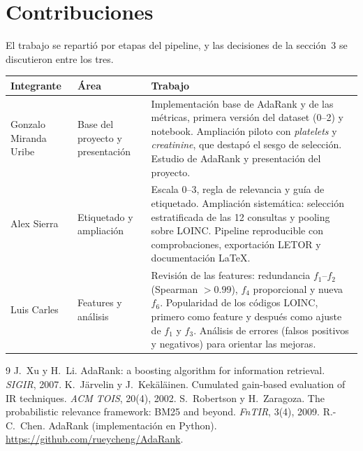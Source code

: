 \documentclass[11pt,a4paper]{article}
\newcommand{\miembroA}{Alex Sierra}
\newcommand{\miembroB}{Luis Carles}
\newcommand{\miembroC}{Gonzalo Miranda Uribe}
\begin{document}
\section{Contribuciones}

El trabajo se repartió por etapas del pipeline, y las decisiones de la sección~3 se discutieron entre los tres.

\begin{center}
\footnotesize
\begin{tabularx}{\linewidth}{>{\raggedright}p{2.6cm} >{\raggedright}p{3.6cm} >{\raggedright\arraybackslash}X}
\toprule
Integrante & Área & Trabajo \\
\midrule
\miembroC & Base del proyecto y presentación &
  Implementación base de AdaRank \cite{adarankgit} y de las métricas, primera versión del dataset (0--2) y notebook.
  Ampliación piloto con \emph{platelets} y \emph{creatinine}, que destapó el sesgo de selección.
  Estudio de AdaRank y presentación del proyecto. \\
\addlinespace
\miembroA & Etiquetado y ampliación &
  Escala 0--3, regla de relevancia y guía de etiquetado. Ampliación sistemática: selección estratificada de las 12 consultas y
  pooling sobre LOINC. Pipeline reproducible con comprobaciones, exportación LETOR y documentación LaTeX. \\
\addlinespace
\miembroB & Features y análisis &
  Revisión de las features: redundancia $f_1$--$f_2$ (Spearman $>0.99$), $f_4$ proporcional y nueva $f_6$.
  Popularidad de los códigos LOINC, primero como feature y después como ajuste de $f_1$ y $f_3$.
  Análisis de errores (falsos positivos y negativos) para orientar las mejoras. \\
\bottomrule
\end{tabularx}
\end{center}

\begin{thebibliography}{9}\small\setlength{\itemsep}{0pt}
 J.~Xu y H.~Li. AdaRank: a boosting algorithm for information retrieval. \emph{SIGIR}, 2007.
 K.~Järvelin y J.~Kekäläinen. Cumulated gain-based evaluation of IR techniques. \emph{ACM TOIS}, 20(4), 2002.
 S.~Robertson y H.~Zaragoza. The probabilistic relevance framework: BM25 and beyond. \emph{FnTIR}, 3(4), 2009.
 R.-C.~Chen. AdaRank (implementación en Python). \url{https://github.com/rueycheng/AdaRank}.
\end{thebibliography}
\end{document}
